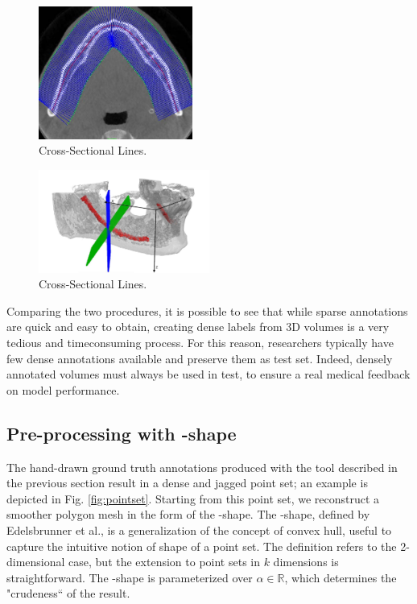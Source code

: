 \begin{figure}[!ht]
  \centering
  \includegraphics[width=0.45\textwidth]{Images/csl.jpg}
  \caption{Cross-Sectional Lines.}
  \label{fig:csl}
\end{figure}

\begin{figure}[!ht]
  \centering
  \includegraphics[width=0.5\textwidth]{Images/csl-orthogonal.jpg}
  \caption{Cross-Sectional Lines.}
  \label{fig:csl-orthogonal}
\end{figure}

Comparing the two procedures, it is possible to see that while sparse
annotations are quick and easy to obtain, creating dense labels from 3D volumes
is a very tedious and timeconsuming process. For this reason, researchers
typically have few dense annotations available and preserve them as test set.
Indeed, densely annotated volumes must always be used in test, to ensure a real
medical feedback on model performance.

\subsection{Pre-processing with \textalpha-shape}
\label{sec:alpha}
The hand-drawn ground truth annotations produced with the tool described in the
previous section result in a dense and jagged point set; an example is depicted
in Fig. \ref{fig:pointset}. Starting from this point set, we reconstruct a smoother polygon mesh
in the form of the \textalpha-shape. The \textalpha-shape, defined by
Edelsbrunner et al., is a generalization of the concept of convex hull,
useful to capture the intuitive notion of shape of a point set. The definition
refers to the 2-dimensional case, but the extension to point sets in $k$
dimensions is straightforward. The \textalpha-shape is parameterized over
$\alpha \in \mathbb{R}$, which determines the "crudeness`` of the result.\\

